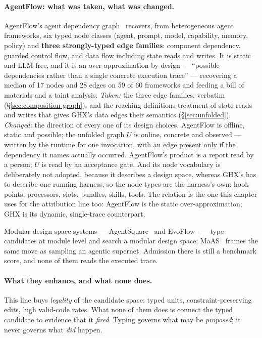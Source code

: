 \paragraph{AgentFlow: what was taken, what was changed.}
AgentFlow's agent dependency graph~\cite{agentflow} recovers, from
heterogeneous agent frameworks, six typed node classes (agent, prompt,
model, capability, memory, policy) and \textbf{three strongly-typed edge
families}: component dependency, guarded control flow, and data flow
including state reads and writes. It is static and LLM-free, and it is
an over-approximation by design --- ``possible dependencies rather than a
single concrete execution trace'' --- recovering a median of 17 nodes
and 28 edges on 59 of 60 frameworks and feeding a bill of materials and a
taint analysis. \emph{Taken:} the three edge families, verbatim
(\S\ref{sec:composition-graph}), and the reaching-definitions treatment
of state reads and writes that gives GHX's data edges their semantics
(\S\ref{sec:unfolded}). \emph{Changed:} the direction of every one of
its design choices. AgentFlow is offline, static and possible; the
unfolded graph $U$ is online, concrete and observed --- written by the
runtime for one invocation, with an edge present only if the dependency
it names actually occurred. AgentFlow's product is a report read by a
person; $U$ is read by an acceptance gate. And its node vocabulary is
deliberately not adopted, because it describes a design space, whereas
GHX's has to describe one running harness, so the node types are the
harness's own: hook points, processors, slots, bundles, skills, tools.
The relation is the one this chapter uses for the attribution line too:
AgentFlow is the static over-approximation; GHX is its dynamic,
single-trace counterpart.

Modular design-space systems --- AgentSquare~\cite{agentsquare} and
EvoFlow~\cite{evoflow} --- type candidates at module level and search a
modular design space; MaAS~\cite{maas} frames the same move as sampling
an agentic supernet. Admission there is still a benchmark score, and none
of them reads the executed trace.

\paragraph{What they enhance, and what none does.} This line buys
\emph{legality} of the candidate space: typed units, constraint-preserving
edits, high valid-code rates. What none of them does is connect the typed
candidate to evidence that it \emph{fired}. Typing governs what may be
\emph{proposed}; it never governs what \emph{did} happen.

